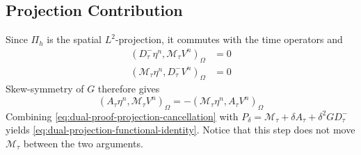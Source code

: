 \documentclass[11pt]{article}
\begin{document}

\subsection{Projection Contribution}
\label{subsec:dual-proof-projection}
Since \(\Pi_h\) is the spatial \(L^2\)-projection, it commutes with the time
operators and
\begin{align}
(D_{\tau}^{-}\eta^n,\mathcal M_{\tau}V^n)_{\Omega}
&=0 \label{eq:dual-proof-first-orthogonality}\\
(\mathcal M_{\tau}\eta^n,D_{\tau}^{-}V^n)_{\Omega}
&=0 \label{eq:dual-proof-second-orthogonality}
\end{align}
Skew-symmetry of \(G\) therefore gives
\begin{equation}
(A_{\tau}\eta^n,\mathcal M_{\tau}V^n)_{\Omega}
=-(\mathcal M_{\tau}\eta^n,A_{\tau}V^n)_{\Omega} \label{eq:dual-proof-projection-cancellation}
\end{equation}
Combining \eqref{eq:dual-proof-projection-cancellation} with
\(P_{\delta}=\mathcal M_{\tau}+\delta A_{\tau}
+\delta^2GD_{\tau}^{-}\) yields
\eqref{eq:dual-projection-functional-identity}. Notice that this step does not
move \(\mathcal M_{\tau}\) between the two arguments.
\end{document}
